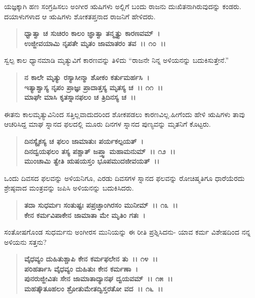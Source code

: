 ಯಜ್ಞಕ್ಕಾಗಿ ಹಣ ಸಂಗ್ರಹಿಸಲು ಅಂಗೀರ ಋಷಿಗಳು ಅಲ್ಲಿಗೆ ಬಂದು ರಾಜನು ದುಃಖಿತನಾಗಿರುವುದನ್ನು ಕಂಡರು. ದಯಾಳುಗಳಾದ ಆ ಋಷಿಗಳು ಶೋಕತಪ್ತನಾದ ರಾಜನಿಗೆ ಹೇಳಿದರು.

\begin{verse}
\textbf{ಧ್ವಾತ್ವಾ ಚ ಸುಚಿರಂ ಕಾಲಂ ಜ್ಞಾತ್ವಾ ತನ್ಮೃತ್ಯು ಕಾರಣವಮ್~।}\\\textbf{ಉಜ್ಜೀವಯಾಮಿ ನೃಪತೇ ಮೃತಂ ಜಾಮಾತರಂ ತವ~।। ೧೦~।।}
\end{verse}

ಸ್ವಲ್ಪ ಕಾಲ ಧ್ಯಾನಮಾಡಿ ಮೃತ್ಯುವಿಗೆ ಕಾರಣವನ್ನು ತಿಳಿದು “ರಾಜನೇ ನಿನ್ನ ಅಳಿಯನನ್ನು ಬದುಕಿಸುತ್ತೇನೆ.”

\begin{verse}
\textbf{ನ ಕಾಲೇ ಮೃತ್ಯು ರಸ್ಯಾಸೀನ್ಮಾ ಶೋಕಂ ಕರ್ತುಮರ್ಹಸಿ~।}\\\textbf{ಇತ್ಯಾಶ್ವಾಸ್ಯ ನೃಪಂ ಪ್ರಾಜ್ಞಃ ಪ್ರಾದಾತ್ತಸ್ಯ ಮೃತಸ್ಯ ಚ~।। ೧೧~।। }\\\textbf{ಮಾಘೇ ಮಾಸಿ ಕೃತಸ್ನಾನಫಲಂ ಚ ತ್ರಿದಿನಸ್ಯ ಚ~।।}
\end{verse}

ಈತನು ಕಾಲಮೃತ್ಯುವಿನಿಂದ ಸತ್ತಿಲ್ಲವಾದುದರಿಂದ ಶೋಕಪಡಲು ಕಾರಣವಿಲ್ಲ.\break ಹೀಗೆಂದು ಹೇಳಿ ಋಷಿಗಳು ತಾವು ಆಚರಿಸಿದ್ದ ಮಾಘ ಸ್ನಾನದ ಫಲದಲ್ಲಿ ಮೂರು ದಿನಗಳ ಸ್ನಾನದ ಪುಣ್ಯವನ್ನು ಮೃತನಿಗೆ ಕೊಟ್ಟರು.

\begin{verse}
\textbf{ದಿನಸ್ಯೈಕಸ್ಯ ಚ ಫಲಂ ಜಾಮಾತುಃ ಪರ್ಯಕಲ್ಪಯತ್~।}\\\textbf{ದಿನದ್ವಯಫಲಂ ತಸ್ಯ ಪಶ್ಚಾತ್ ಜಪ್ತ್ವಾ ಮಹಾಮನುಮ್~।। ೧೨~।। }\\\textbf{ಮುಂಚಾಮಿ ತ್ವೇತಿ ಋಷಯಸ್ತಂ ಭೂಪಮುದಜೀವಯತ್~।।}
\end{verse}

ಒಂದು ದಿವಸದ ಫಲವನ್ನು ಅಳಿಯನಿಗೂ, ಎರಡು ದಿವಸಗಳ ಸ್ನಾನದ ಫಲವನ್ನು ರೋಚಿಷ್ಮತಿಗೂ ಧಾರೆಯೆರದು ಶ್ರೇಷ್ಠವಾದ ಮಂತ್ರವನ್ನು ಜಪಿಸಿ ಅಳಿಯನನ್ನು ಬದುಕಿಸಿದರು.

\begin{verse}
\textbf{ತದಾ ಸುಧರ್ಮಃ ಸಂತುಷ್ಟಃ ಪಪ್ರಚ್ಛಾಂಗಿರಸಂ ಮುನೀಮ್~।। ೧೩~।।}\\\textbf{ಕೇನ ಕರ್ಮವಿಪಾಕೇನ ಜಾಮಾತಾ ಮೇ ಮೃತಿಂ ಗತಃ~।}
\end{verse}

ಸಂತೋಷಗೊಂಡ ಸುಧರ್ಮನು ಅಂಗೀರಸ ಮುನಿಯನ್ನು ಈ ರೀತಿ ಪ್ರಶ್ನಿಸಿದನು- ಯಾವ ಕರ್ಮ ವಿಶೇಷದಿಂದ ನನ್ನ ಅಳಿಯನು ಸತ್ತನು?

\begin{verse}
\textbf{ವೈಧವ್ಯಂ ದುಹಿತುಶ್ಚಾಪಿ ಕೇನ ಕರ್ಮಫಲೇನ ತು~।। ೧೪~।।}\\\textbf{ಪರಿಹರ್ತಾಸಿ ವೈಧವ್ಯಂ ದುಹಿತುಃ ಕೇನ ಕರ್ಮಣಾ~।}\\\textbf{ಪುನರುಜ್ಜೀವಿತಃ ಸೇನ ಜಾಮಾತಾದ್ಯಾನಘ ದ್ವಯವಮ್~।। ೧೫~।।}\\\textbf{ಮಹತ್ಕೌತೂಹಲಂ ಶ್ರೋತುಮೇತದ್ವಿಸ್ತರತೋ ವದ~।। ೧೬~।।}
\end{verse}

